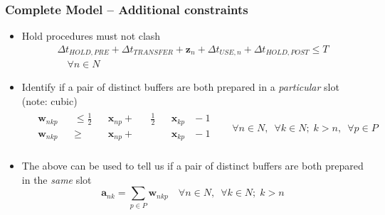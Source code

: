 \documentclass{beamer}
\begin{document}
\begin{frame}
    \frametitle{Complete Model -- Additional constraints}
    \begin{itemize}
        \item Hold procedures must not clash
        \begin{multline}
            \Delta t_{\mathit{HOLD,PRE}} + \Delta t_{\mathit{TRANSFER}}
            + \boldsymbol{z}_{n} + \Delta t_{\mathit{USE},n} 
            + \Delta t_{\mathit{HOLD,POST}} \le T\\ \quad \forall n \in N
        \end{multline}
        \item Identify if a pair of distinct buffers are both prepared in a
        \emph{particular} slot (note: cubic)
        \begin{equation}
            \begin{split}
                \begin{alignedat}{11}
                    &\boldsymbol{w}_{nkp} {}&&\le{} \tfrac{1}{2} 
                    &&\boldsymbol{x}_{np}
                    {}+{} &&\tfrac{1}{2} && \boldsymbol{x}_{kp} &{}-{} 1\\
                    &\boldsymbol{w}_{nkp} {}&&\ge{} &&\boldsymbol{x}_{np} {}+{}
                    && && \boldsymbol{x}_{kp} &{}-{} 1\\
                \end{alignedat}
            \end{split}
            \quad
            \begin{split}
                \forall n \in N, \enspace \forall k \in N; \; k > n, \enspace 
                \forall p \in P
            \end{split}
            \label{eq.w1}
        \end{equation}
        \item The above can be used to tell us if  a pair of distinct buffers
        are both prepared in the \emph{same} slot
        \begin{equation}
            \boldsymbol{a}_{nk} = \sum_{p \in P} \boldsymbol{w}_{nkp} \quad
            \forall n \in N, \enspace \forall k \in N; \; k > n
            \label{eq.a1}
        \end{equation}
    \end{itemize}
\end{frame}
\end{document}
